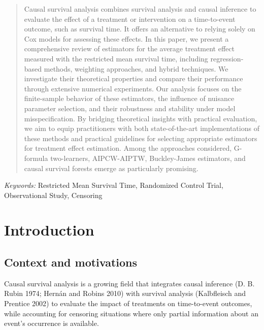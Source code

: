 \documentclass[
  11pt,
  a4paper,
]{article}
\renewcommand*\contentsname{Table of contents}
\newcommand\contentsname{Table of contents}
\theoremstyle{plain}
\theoremstyle{plain}
\theoremstyle{plain}
\theoremstyle{definition}
\theoremstyle{remark}
\begin{document}
\bigskip
\begin{abstract}
Causal survival analysis combines survival analysis and causal inference
to evaluate the effect of a treatment or intervention on a time-to-event
outcome, such as survival time. It offers an alternative to relying
solely on Cox models for assessing these effects. In this paper, we
present a comprehensive review of estimators for the average treatment
effect measured with the restricted mean survival time, including
regression-based methods, weighting approaches, and hybrid techniques.
We investigate their theoretical properties and compare their
performance through extensive numerical experiments. Our analysis
focuses on the finite-sample behavior of these estimators, the influence
of nuisance parameter selection, and their robustness and stability
under model misspecification. By bridging theoretical insights with
practical evaluation, we aim to equip practitioners with both
state-of-the-art implementations of these methods and practical
guidelines for selecting appropriate estimators for treatment effect
estimation. Among the approaches considered, G-formula two-learners,
AIPCW-AIPTW, Buckley-James estimators, and causal survival forests
emerge as particularly promising.
\end{abstract}

\noindent%
{\it Keywords:} Restricted Mean Survival Time, Randomized Control
Trial, Observational Study, Censoring
\vfill


\renewcommand*\contentsname{Contents}
{
\hypersetup{linkcolor=}
\setcounter{tocdepth}{3}
\tableofcontents
}

\section{Introduction}\label{sec-intro}

\subsection{Context and motivations}\label{sec-context}

Causal survival analysis is a growing field that integrates causal
inference (D. B. Rubin 1974; Hernán and Robins 2010) with survival
analysis (Kalbfleisch and Prentice 2002) to evaluate the impact of
treatments on time-to-event outcomes, while accounting for censoring
situations where only partial information about an event's occurrence is
available.
\end{document}
